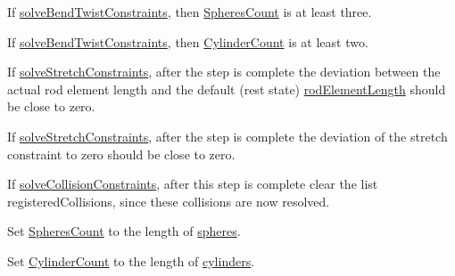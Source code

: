 \begin{DoxyRefList}
If \mbox{\hyperlink{class_guidewire_sim_1_1_simulation_loop_a90c6c5c53241222d0dc73a95f1659561}{solve\+Bend\+Twist\+Constraints}}, then \mbox{\hyperlink{class_guidewire_sim_1_1_simulation_loop_a888a52671506bb05713182f7c1ab3a7f}{Spheres\+Count}} is at least three. 



If \mbox{\hyperlink{class_guidewire_sim_1_1_simulation_loop_a90c6c5c53241222d0dc73a95f1659561}{solve\+Bend\+Twist\+Constraints}}, then \mbox{\hyperlink{class_guidewire_sim_1_1_simulation_loop_a74a6cb09e5dd74946aa0116e612c334d}{Cylinder\+Count}} is at least two. 



If \mbox{\hyperlink{class_guidewire_sim_1_1_simulation_loop_ac137704c785d76e873c319628552c13c}{solve\+Stretch\+Constraints}}, after the step is complete the deviation between the actual rod element length and the default (rest state) \mbox{\hyperlink{class_guidewire_sim_1_1_simulation_loop_a0671ca94ded523a65654826d1ad58bf8}{rod\+Element\+Length}} should be close to zero. 



If \mbox{\hyperlink{class_guidewire_sim_1_1_simulation_loop_ac137704c785d76e873c319628552c13c}{solve\+Stretch\+Constraints}}, after the step is complete the deviation of the stretch constraint to zero should be close to zero. 



If \mbox{\hyperlink{class_guidewire_sim_1_1_simulation_loop_a7624ceba45187682a66befe96209a347}{solve\+Collision\+Constraints}}, after this step is complete clear the list {\ttfamily registered\+Collisions}, since these collisions are now resolved.  
\item[Member \mbox{\hyperlink{class_guidewire_sim_1_1_simulation_loop_a61c3615748e8bd34a3247e675a55ceb1}{Guidewire\+Sim.Simulation\+Loop.Perform\+Initialization\+Step}} ()]\label{requirement__requirement000019}%
%
 Set \mbox{\hyperlink{class_guidewire_sim_1_1_simulation_loop_a888a52671506bb05713182f7c1ab3a7f}{Spheres\+Count}} to the length of \mbox{\hyperlink{class_guidewire_sim_1_1_simulation_loop_a89639700e967542512065f7452c535b6}{spheres}}. 



Set \mbox{\hyperlink{class_guidewire_sim_1_1_simulation_loop_a74a6cb09e5dd74946aa0116e612c334d}{Cylinder\+Count}} to the length of \mbox{\hyperlink{class_guidewire_sim_1_1_simulation_loop_adff65d2c5dc025e8327d0926dc492a2f}{cylinders}}. 




\end{DoxyRefList}
